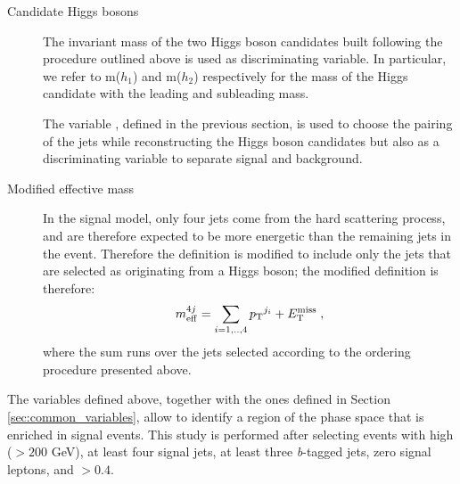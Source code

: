 \begin{description}
\item[Candidate Higgs bosons] The invariant mass of the two Higgs boson candidates built following the procedure outlined above 
is used as discriminating variable. In particular, we refer to m($h_1$) and m($h_2$) respectively for the mass of the Higgs candidate with 
the leading and subleading mass.

The variable \dRmax, defined in the previous section, is used to choose the pairing of the jets while reconstructing 
the Higgs boson candidates but also as a discriminating variable to separate signal and background. 

\item[Modified effective mass] In the signal model, only four jets come from the hard scattering process, and are therefore expected to be more energetic than the 
remaining jets in the event. Therefore the \meff definition is modified to include only the jets that are selected 
as originating from a Higgs boson; the modified definition is therefore:
\begin{equation}
m_{\mathrm{eff}}^{4j} = \sum_{i=1,..,4} {p_{\rm T}}^{j_i} + E_{\rm T}^{\mathrm{miss}} \; , \nonumber
\end{equation}
\noindent where the sum runs over the jets selected according to the ordering procedure presented above.

\end{description}

The variables defined above, together with the ones defined in Section \ref{sec:common_variables},  
allow to identify a region of the phase space that is enriched in signal events. 
This study is performed after selecting events with high \met ($> 200$ GeV), at least four signal jets, at least three \textit{b}-tagged jets, zero signal leptons, and \dphimin $>0.4$.

